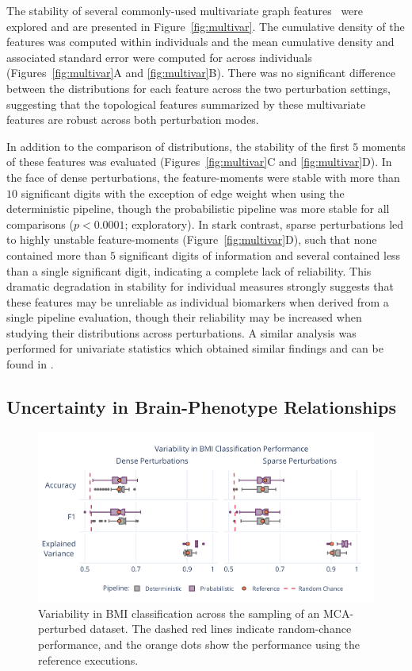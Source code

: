 \documentclass[fleqn,10pt]{SelfArx} %
\newcommand{\new}[1]{{#1}}
\begin{document}
The stability of several commonly-used multivariate graph features~\cite{Betzel2018-eo} \new{were} explored \new{and
are presented} in Figure~\ref{fig:multivar}. The cumulative density of the features was computed within individuals and
the mean \new{cumulative} density and associated standard error were computed for across individuals
(Figures~\ref{fig:multivar}A and \ref{fig:multivar}B). There was no significant difference between the distributions
for each feature across the two perturbation settings, suggesting that the topological features summarized by these
multivariate features are robust across both perturbation modes.

In addition to the comparison of distributions, the stability of the first $5$ moments of these features was evaluated
(Figures~\ref{fig:multivar}C and \ref{fig:multivar}D). In the face of \new{dense} perturbations, the feature-moments
were stable with more than $10$ significant digits with the exception of edge weight when using the deterministic
pipeline, though the probabilistic pipeline was more stable for all comparisons ($p < 0.0001$; exploratory). In stark
contrast, \new{sparse} perturbations led to highly unstable feature-moments (Figure~\ref{fig:multivar}D), such that
none contained more than $5$ significant digits of information and several contained less than a single significant
digit, indicating a complete lack of reliability. This dramatic degradation in stability for individual measures
strongly suggests that these features may be unreliable as individual biomarkers when derived from a single pipeline
evaluation, though their reliability may be increased when studying their distributions across perturbations. A similar
analysis was performed for univariate statistics \new{which obtained similar findings} and can be found in
.

\subsection*{Uncertainty in Brain-Phenotype Relationships}

\begin{figure}[ht]\centering
\includegraphics[width=0.7\linewidth]{figures/fig3_bmi_classification.pdf}
\caption{Variability in BMI classification across the sampling of an MCA-perturbed dataset. The dashed red lines
indicate random-chance performance, and the orange dots show the performance using the reference executions.}
\label{fig:bmi}
\end{figure}
 
\end{document}
